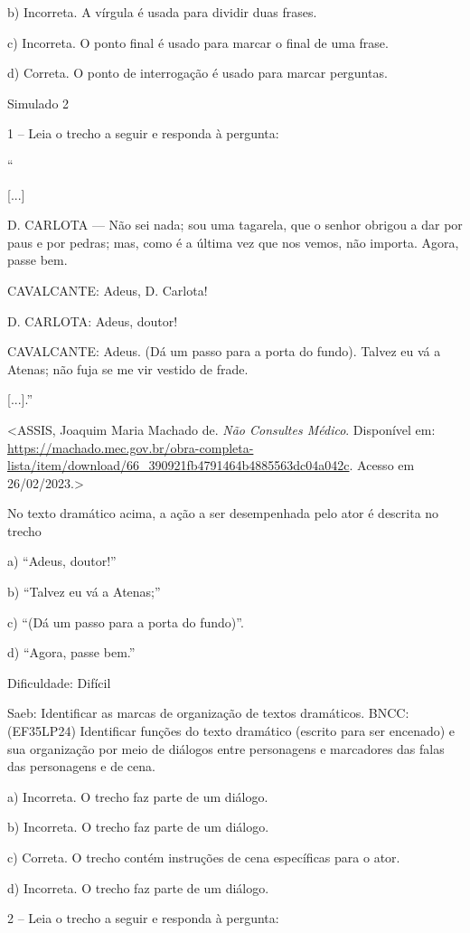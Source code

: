 b) Incorreta. A vírgula é usada para dividir duas frases.

c) Incorreta. O ponto final é usado para marcar o final de uma frase.

d) Correta. O ponto de interrogação é usado para marcar perguntas.

Simulado 2

1 -- Leia o trecho a seguir e responda à pergunta:

``

{[}...{]}

D. CARLOTA --- Não sei nada; sou uma tagarela, que o senhor obrigou a
dar por paus e por pedras; mas, como é a última vez que nos vemos, não
importa. Agora, passe bem.

CAVALCANTE: Adeus, D. Carlota!

D. CARLOTA: Adeus, doutor!

CAVALCANTE: Adeus. (Dá um passo para a porta do fundo). Talvez eu vá a
Atenas; não fuja se me vir vestido de frade.

{[}...{]}.''

\textless{}ASSIS, Joaquim Maria Machado de. \emph{Não Consultes Médico}.
Disponível em:
\url{https://machado.mec.gov.br/obra-completa-lista/item/download/66_390921fb4791464b4885563dc04a042c}.
Acesso em 26/02/2023.\textgreater{}

No texto dramático acima, a ação a ser desempenhada pelo ator é descrita
no trecho

a) ``Adeus, doutor!''

b) ``Talvez eu vá a Atenas;''

c) ``(Dá um passo para a porta do fundo)''.

d) ``Agora, passe bem.''

Dificuldade: Difícil

Saeb: Identificar as marcas de organização de textos dramáticos. BNCC:
(EF35LP24) Identificar funções do texto dramático (escrito para ser
encenado) e sua organização por meio de diálogos entre personagens e
marcadores das falas das personagens e de cena.

a) Incorreta. O trecho faz parte de um diálogo.

b) Incorreta. O trecho faz parte de um diálogo.

c) Correta. O trecho contém instruções de cena específicas para o ator.

d) Incorreta. O trecho faz parte de um diálogo.

2 -- Leia o trecho a seguir e responda à pergunta:

